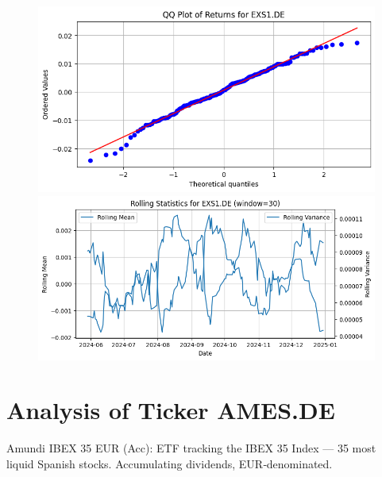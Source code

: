 \documentclass{article}%
\begin{document}
%


\begin{figure}[htbp]%
\begin{minipage}{0.31\textwidth}%
\includegraphics[width=\linewidth]{ticker_images/EXS1.DE_qq_plot.png}%
\end{minipage}%
\begin{minipage}{0.31\textwidth}%
\includegraphics[width=\linewidth]{ticker_images/EXS1.DE_rolling_stats.png}%
\end{minipage}%
\end{figure}

%
\section*{Analysis of Ticker AMES.DE}%
\label{sec:AnalysisofTickerAMES.DE}%
Amundi IBEX 35 EUR (Acc): ETF tracking the IBEX 35 Index — 35 most liquid Spanish stocks. Accumulating dividends, EUR‑denominated.%
\end{document}
